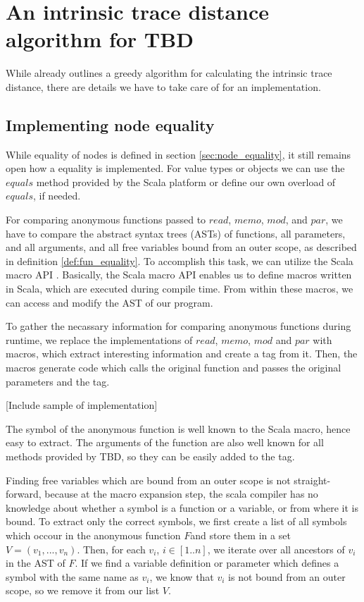 \section{An intrinsic trace distance algorithm for TBD}
While \cite{Acar2005thesis} already outlines a greedy algorithm for calculating the intrinsic trace distance, there are details we have to take care of for an implementation.

\subsection{Implementing node equality}
While equality of nodes is defined in section \ref{sec:node_equality}, it still remains open how a equality is implemented. For value types or objects we can use the $equals$ method provided by the Scala platform or define our own overload of $equals$, if needed.  

For comparing anonymous functions passed to $read$, $memo$, $mod$, and $par$, we have to compare the abstract syntax trees (ASTs) of functions, all parameters, and all arguments, and all free variables bound from an outer scope, as described in definition \ref{def:fun_equality}. To accomplish this task, we can utilize the Scala macro API \cite{burmako2013scala}. Basically, the Scala macro API enables us to define macros written in Scala, which are executed during compile time. From within these macros, we can access and modify the AST of our program. 

To gather the necassary information for comparing anonymous functions during runtime, we replace the implementations of $read$, $memo$, $mod$ and $par$ with macros, which extract interesting information and create a tag from it. Then, the macros generate code which calls the original function and passes the original parameters and the tag. 

[Include sample of implementation]

The symbol of the anonymous function is well known to the Scala macro, hence easy to extract. The arguments of the function are also well known for all methods provided by TBD, so they can be easily added to the tag. 

Finding free variables which are bound from an outer scope is not straight-forward, because at the macro expansion step, the scala compiler has no knowledge about whether a symbol is a function or a variable, or from where it is bound. To extract only the correct symbols, we first create a list of all symbols which occour in the anonymous function $F$and store them in a set $V = (v_1, ..., v_n)$. Then, for each $v_i$, $i \in[1..n]$, we iterate over all ancestors of $v_i$ in the AST of $F$. If we find a variable definition or parameter which defines a symbol with the same name as $v_i$, we know that $v_i$ is not bound from an outer scope, so we remove it from our list $V$.


